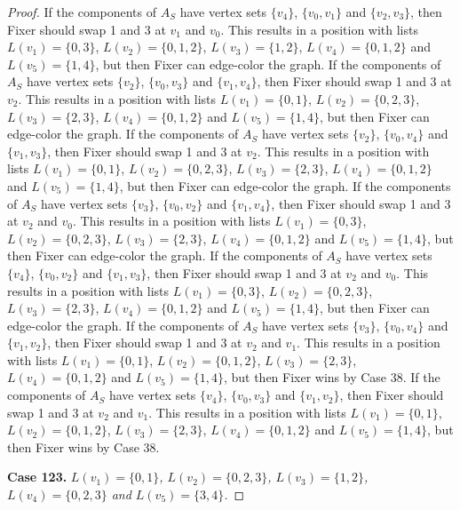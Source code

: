 \documentclass[12pt]{amsart}
\theoremstyle{plain}
\theoremstyle{definition}
\theoremstyle{remark}
\begin{document}
\begin{proof}
If the components of $A_S$ have vertex sets $\{v_4\}$, $\{v_0, v_1\}$ and $\{v_2, v_3\}$, then Fixer should swap 1 and 3 at $v_1$ and $v_0$. This results in a position with lists $L(v_1) = \{0, 3\}$, $L(v_2) = \{0, 1, 2\}$, $L(v_3) = \{1, 2\}$, $L(v_4) = \{0, 1, 2\}$ and $L(v_5) = \{1, 4\}$, but then Fixer can edge-color the graph.
If the components of $A_S$ have vertex sets $\{v_2\}$, $\{v_0, v_3\}$ and $\{v_1, v_4\}$, then Fixer should swap 1 and 3 at $v_2$. This results in a position with lists $L(v_1) = \{0, 1\}$, $L(v_2) = \{0, 2, 3\}$, $L(v_3) = \{2, 3\}$, $L(v_4) = \{0, 1, 2\}$ and $L(v_5) = \{1, 4\}$, but then Fixer can edge-color the graph.
If the components of $A_S$ have vertex sets $\{v_2\}$, $\{v_0, v_4\}$ and $\{v_1, v_3\}$, then Fixer should swap 1 and 3 at $v_2$. This results in a position with lists $L(v_1) = \{0, 1\}$, $L(v_2) = \{0, 2, 3\}$, $L(v_3) = \{2, 3\}$, $L(v_4) = \{0, 1, 2\}$ and $L(v_5) = \{1, 4\}$, but then Fixer can edge-color the graph.
If the components of $A_S$ have vertex sets $\{v_3\}$, $\{v_0, v_2\}$ and $\{v_1, v_4\}$, then Fixer should swap 1 and 3 at $v_2$ and $v_0$. This results in a position with lists $L(v_1) = \{0, 3\}$, $L(v_2) = \{0, 2, 3\}$, $L(v_3) = \{2, 3\}$, $L(v_4) = \{0, 1, 2\}$ and $L(v_5) = \{1, 4\}$, but then Fixer can edge-color the graph.
If the components of $A_S$ have vertex sets $\{v_4\}$, $\{v_0, v_2\}$ and $\{v_1, v_3\}$, then Fixer should swap 1 and 3 at $v_2$ and $v_0$. This results in a position with lists $L(v_1) = \{0, 3\}$, $L(v_2) = \{0, 2, 3\}$, $L(v_3) = \{2, 3\}$, $L(v_4) = \{0, 1, 2\}$ and $L(v_5) = \{1, 4\}$, but then Fixer can edge-color the graph.
If the components of $A_S$ have vertex sets $\{v_3\}$, $\{v_0, v_4\}$ and $\{v_1, v_2\}$, then Fixer should swap 1 and 3 at $v_2$ and $v_1$. This results in a position with lists $L(v_1) = \{0, 1\}$, $L(v_2) = \{0, 1, 2\}$, $L(v_3) = \{2, 3\}$, $L(v_4) = \{0, 1, 2\}$ and $L(v_5) = \{1, 4\}$, but then Fixer wins by Case 38.
If the components of $A_S$ have vertex sets $\{v_4\}$, $\{v_0, v_3\}$ and $\{v_1, v_2\}$, then Fixer should swap 1 and 3 at $v_2$ and $v_1$. This results in a position with lists $L(v_1) = \{0, 1\}$, $L(v_2) = \{0, 1, 2\}$, $L(v_3) = \{2, 3\}$, $L(v_4) = \{0, 1, 2\}$ and $L(v_5) = \{1, 4\}$, but then Fixer wins by Case 38.

\noindent\textbf{Case 123.  }\textit{$L(v_1) = \{0, 1\}$, $L(v_2) = \{0, 2, 3\}$, $L(v_3) = \{1, 2\}$, $L(v_4) = \{0, 2, 3\}$ and $L(v_5) = \{3, 4\}$.}


\end{proof}
\end{document}

